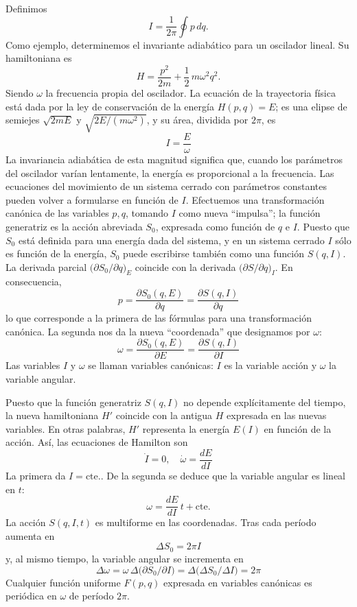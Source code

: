 \documentclass[12pt]{article}
\begin{document}
Definimos
\[
I = \frac{1}{2\pi}\oint p\,dq.
\]
Como ejemplo, determinemos el invariante adiabático para un oscilador lineal. Su hamiltoniana es
\[
H = \frac{p^2}{2m} + \frac{1}{2}\,m\omega^2 q^2.
\]
Siendo \(\omega\) la frecuencia propia del oscilador. La ecuación de la trayectoria física está dada por la ley de conservación de la energía \(H(p,q)=E\); es una elipse de semiejes \(\sqrt{2mE}\) y \(\sqrt{2E/(m\omega^2)}\), y su área, dividida por \(2\pi\), es
\[
I = \frac{E}{\omega}
\tag{49.7}
\]
La invariancia adiabática de esta magnitud significa que, cuando los parámetros del oscilador varían lentamente, la energía es proporcional a la frecuencia. Las ecuaciones del movimiento de un sistema cerrado con parámetros constantes pueden volver a formularse en función de \(I\). Efectuemos una transformación canónica de las variables \(p,q\), tomando \(I\) como nueva “impulsa”; la función generatriz es la acción abreviada \(S_0\), expresada como función de \(q\) e \(I\). Puesto que \(S_0\) está definida para una energía dada del sistema, y en un sistema cerrado \(I\) sólo es función de la energía, \(S_0\) puede escribirse también como una función \(S(q,I)\). La derivada parcial \(\bigl(\partial S_0/\partial q\bigr)_E\) coincide con la derivada \(\bigl(\partial S/\partial q\bigr)_I\). En consecuencia,
\[
p = \frac{\partial S_0(q,E)}{\partial q}
  = \frac{\partial S(q,I)}{\partial q}
\tag{49.8}
\]
lo que corresponde a la primera de las fórmulas para una transformación canónica. La segunda nos da la nueva “coordenada” que designamos por \(\omega\):
\[
\omega = \frac{\partial S_0(q,E)}{\partial E}
        = \frac{\partial S(q,I)}{\partial I}
\tag{49.9}
\]
Las variables \(I\) y \(\omega\) se llaman variables canónicas: \(I\) es la variable acción y \(\omega\) la variable angular.

Puesto que la función generatriz \(S(q,I)\) no depende explícitamente del tiempo, la nueva hamiltoniana \(H'\) coincide con la antigua \(H\) expresada en las nuevas variables. En otras palabras, \(H'\) representa la energía \(E(I)\) en función de la acción. Así, las ecuaciones de Hamilton son
\[
\dot I = 0,\quad
\dot \omega = \frac{dE}{dI}
\tag{49.10}
\]
La primera da \(I=\mathrm{cte.}\). De la segunda se deduce que la variable angular es lineal en \(t\):
\[
\omega = \frac{dE}{dI}\,t + \mathrm{cte.}
\tag{49.11}
\]
La acción \(S(q,I,t)\) es multiforme en las coordenadas. Tras cada período aumenta en
\[
\Delta S_0 = 2\pi I
\tag{49.12}
\]
y, al mismo tiempo, la variable angular se incrementa en
\[
\Delta\omega
= \omega\,\Delta\bigl(\partial S_0/\partial I\bigr)
= \Delta\bigl(\Delta S_0/\Delta I\bigr)
= 2\pi
\tag{49.13}
\]
Cualquier función uniforme \(F(p,q)\) expresada en variables canónicas es periódica en \(\omega\) de período \(2\pi\).
\end{document}
